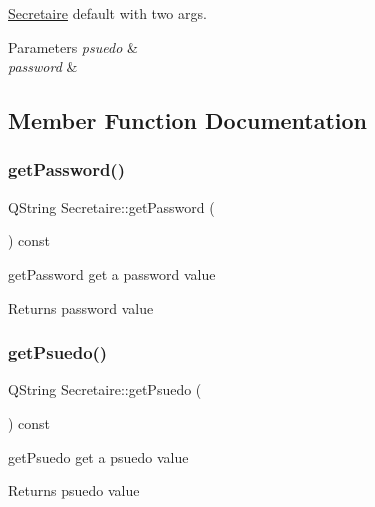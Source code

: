 \mbox{\hyperlink{class_secretaire}{Secretaire}} default with two args. 


\begin{DoxyParams}{Parameters}
{\em psuedo} & \\
\hline
{\em password} & \\
\hline
\end{DoxyParams}


\subsection{Member Function Documentation}
\mbox{\label{class_secretaire_ad3555274c8a2ef05af01273ff8513baa}} 
\subsubsection{\texorpdfstring{getPassword()}{getPassword()}}
{\footnotesize\ttfamily Q\+String Secretaire\+::get\+Password (\begin{DoxyParamCaption}{ }\end{DoxyParamCaption}) const}



get\+Password get a password value 

\begin{DoxyReturn}{Returns}
password value 
\end{DoxyReturn}
\mbox{\label{class_secretaire_a1331945f37877493d3f9f0384bff5347}} 
\subsubsection{\texorpdfstring{getPsuedo()}{getPsuedo()}}
{\footnotesize\ttfamily Q\+String Secretaire\+::get\+Psuedo (\begin{DoxyParamCaption}{ }\end{DoxyParamCaption}) const}



get\+Psuedo get a psuedo value 

\begin{DoxyReturn}{Returns}
psuedo value 
\end{DoxyReturn}
\mbox{\label{class_secretaire_ae7eb96f900703ae3e74d6a40b60c7482}} 

